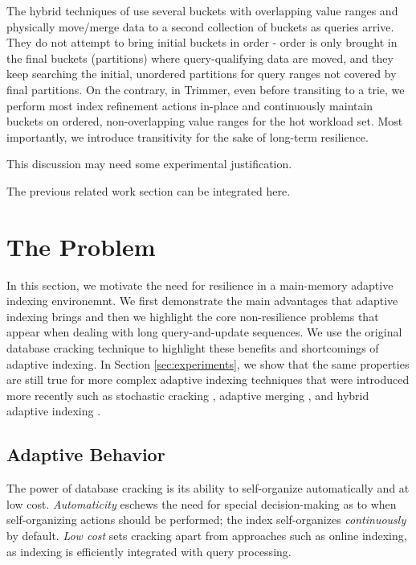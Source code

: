 \documentclass{sig-alternate}
\begin{document}
The hybrid techniques of \cite{AdaptiveIndexing} use several buckets with overlapping value ranges and physically move/merge data to a second collection of buckets as queries arrive. They do not attempt to bring initial buckets in order - order is only brought in the final buckets (partitions) where query-qualifying data are moved, and they keep searching the initial, unordered partitions for query ranges not covered by final partitions. On the contrary, in Trimmer, even before transiting to a trie, we perform most index refinement actions in-place and continuously maintain buckets on ordered, non-overlapping value ranges for the hot workload set. Most importantly, we introduce transitivity for the sake of long-term resilience.

This discussion may need some experimental justification.

The previous related work section can be integrated here.
%


\section{The Problem}\label{sec:problem}

In this section, we motivate the need for resilience in a main-memory adaptive indexing environemnt. We first demonstrate the main advantages that adaptive indexing brings and then we highlight the core non-resilience problems that appear when dealing with long query-and-update sequences. We use the original database cracking technique to highlight these benefits and shortcomings of adaptive indexing. In Section \ref{sec:experiments}, we show that the same properties are still true for more complex adaptive indexing techniques that were introduced more recently such as stochastic cracking \cite{StochasticCracking}, adaptive merging \cite{GK10b}, and hybrid adaptive indexing \cite{AdaptiveIndexing}.


\subsection{Adaptive Behavior}

The power of database cracking is its ability to self-organize automatically and at low cost. {\em Automaticity} eschews the need for special decision-making as to when self-organizing actions should be performed; the index self-organizes \emph{continuously} by default. {\em Low cost} sets cracking apart from approaches such as online indexing, as indexing is efficiently integrated with query processing.
\end{document}
